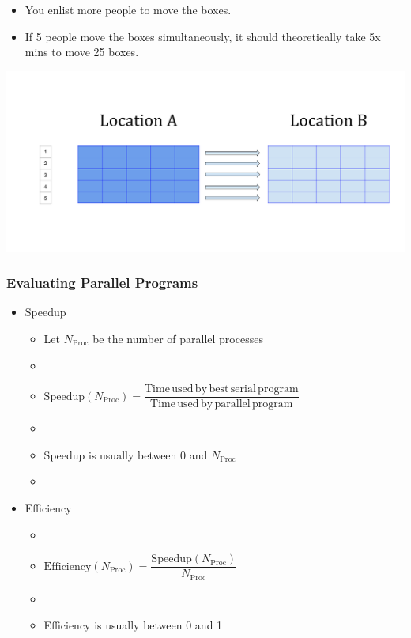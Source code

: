\documentclass[10pt,t]{beamer}
\begin{document}
\begin{frame}
  \frametitle{ }
  \begin{itemize}
  \item You enlist more people to move the boxes.
  \item If 5 people move the boxes simultaneously, it should theoretically take 5x mins to move 25 boxes.
  \end{itemize}
  \includegraphics[width=\textwidth,clip=true]{./Parallel}
\end{frame}

\begin{frame}
  \frametitle{Evaluating Parallel Programs}
  \begin{itemize}
  \item Speedup
    \begin{itemize}
    \item Let $N_{\mathrm{Proc}}$ be the number of parallel processes
    \item[] 
    \item $\mathrm{Speedup}(N_{\mathrm{Proc}}) = \dfrac{\mathrm{Time\,used\,by\,best\,serial\,program}}{\mathrm{Time\,used\,by\,parallel\,program}}$ 
    \item[]
    \item Speedup is usually between 0 and $N_{\mathrm{Proc}}$
    \item[] 
    \end{itemize}
  \item Efficiency
    \begin{itemize}
    \item[]
    \item $\mathrm{Efficiency}(N_{\mathrm{Proc}}) = \dfrac{\mathrm{Speedup}(N_{\mathrm{Proc}})}{N_{\mathrm{Proc}}}$
    \item[]
    \item Efficiency is usually between 0 and 1
    \end{itemize}
  \end{itemize}
\end{frame}
\end{document}
